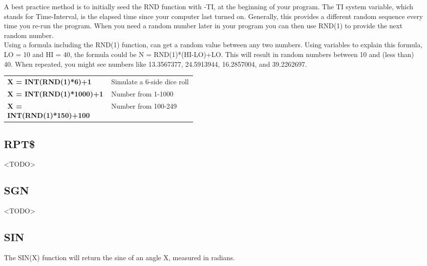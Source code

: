 A best practice method is to initially seed the {\ttfamily RND} function with
{\ttfamily -TI}, at the beginning of your program.  The {\ttfamily TI} system
variable, which stands for Time-Interval, is the elapsed time since your
computer last turned on.  Generally, this provides a different random sequence
every time you re-run the program.  When you need a random number later in your
program you can then use RND(1) to provide the next random number.\\

Using a formula including the {\ttfamily RND(1)} function, can get a random
value between any two numbers.  Using variables to explain this formula,
{\ttfamily LO = 10} and {\ttfamily HI = 40}, the formula could be {\ttfamily N
= RND(1)*(HI-LO)+LO}.  This will result in random numbers between 10 and (less
than) 40. When repeated, you might see numbers like 13.3567377, 24.5913944,
16.2857004, and 39.2262697.\\

\begin{tabular}{l p{0.45\linewidth}}

	{\ttfamily\bfseries X = INT(RND(1)*6)+1} & Simulate a 6-side dice roll\\

	{\ttfamily\bfseries X = INT(RND(1)*1000)+1} & Number from 1-1000\\

	{\ttfamily\bfseries X = INT(RND(1)*150)+100} & Number from 100-249\\

\end{tabular}

\vspace{16pt}

\subsection{RPT\$}

<TODO>

\subsection{SGN}

<TODO>

\subsection{SIN}

The {\ttfamily SIN(X)} function will return the sine of an angle {\ttfamily X},
measured in radians.\\

